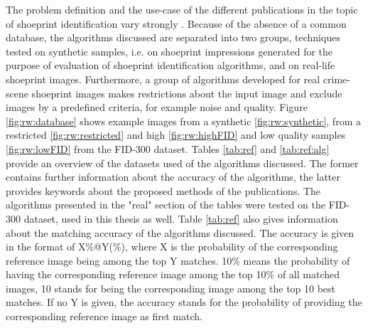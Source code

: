 \documentclass[draft,final]{vutinfth} %
\begin{document}
\par
The problem definition and the use-case of the different publications in the topic of shoeprint identification vary strongly \cite{rida2019forensic}.
Because of the absence of a common database, the algorithms discussed are separated into two groups, techniques tested on synthetic samples, i.e. on shoeprint impressions generated for the purpose of evaluation of shoeprint identification algorithms, and on real-life shoeprint images.
Furthermore, a group of algorithms developed for real crime-scene shoeprint images makes restrictions about the input image and exclude images by a predefined criteria, for example noise and quality.
Figure \ref{fig:rw:database} shows example images from a synthetic \ref{fig:rw:synthetic}, from a restricted \ref{fig:rw:restricted} and high \ref{fig:rw:highFID} and low quality samples \ref{fig:rw:lowFID} from the FID-300 dataset.
Tables \ref{tab:ref} and \ref{tab:ref:alg} provide an overview of the datasets used of the algorithms discussed. 
The former contains further information about the accuracy of the algorithms, the latter provides keywords about the proposed methods of the publications.
The algorithms presented in the "real" section of the tables were tested on the FID-300 dataset, used in this thesis as well.
Table \ref{tab:ref} also gives information about the matching accuracy of the algorithms discussed.
The accuracy is given in the format of X\%@Y(\%), where X is the probability of the corresponding reference image being among the top Y matches. 
10\% means the probability of having the corresponding reference image among the top 10\% of all matched images, 10 stands for being the corresponding image among the top 10 best matches.
If no Y is given, the accuracy stands for the probability of providing the corresponding reference image as first match.
\end{document}
